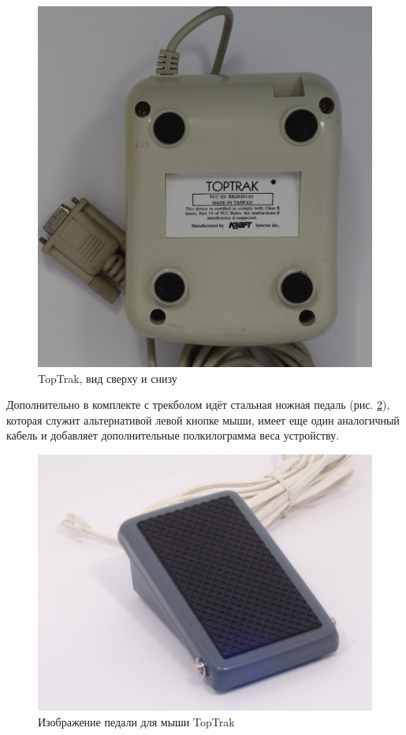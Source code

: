 \documentclass[11pt, a4paper]{article}
\begin{document}
\begin{figure}[h]
    \includegraphics[scale=0.5]{1990_kraft_toptrack/2.10.jpg}
    \caption{TopTrak, вид сверху и снизу}
    \label{fig:TopTrakTopAndBottom}
\end{figure}

Дополнительно в комплекте с трекболом идёт стальная ножная педаль (рис. \ref{fig:TopTrakPedal}), которая служит альтернативой левой кнопке мыши, имеет еще один аналогичный кабель и добавляет дополнительные полкилограмма веса устройству.

\begin{figure}[h]
    \centering
    \includegraphics[scale=0.45]{1990_kraft_toptrack/2.7.jpg}
    \caption{Изображение педали для мыши TopTrak}
    \label{fig:TopTrakPedal}
\end{figure}
\end{document}
